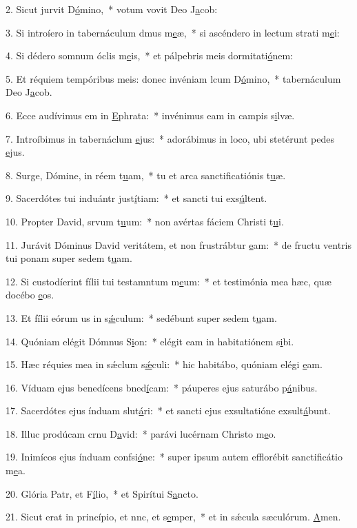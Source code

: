 2. Sicut jurvit D\uline{ó}mino,~* votum vovit Deo J\uline{a}cob:\par 
3. Si introíero in tabernáculum dmus m\uline{e}æ,~* si ascéndero in lectum strati m\uline{e}i:\par 
4. Si dédero somnum óclis m\uline{e}is,~* et pálpebris meis dormitati\uline{ó}nem:\par 
5. Et réquiem tempóribus meis: donec invéniam lcum D\uline{ó}mino,~* tabernáculum Deo J\uline{a}cob.\par 
6. Ecce audívimus em in \uline{E}phrata:~* invénimus eam in campis s\uline{i}lvæ.\par 
7. Introíbimus in tabernáclum \uline{e}jus:~* adorábimus in loco, ubi stetérunt pedes \uline{e}jus.\par 
8. Surge, Dómine, in réem t\uline{u}am,~* tu et arca sanctificatiónis t\uline{u}æ.\par 
9. Sacerdótes tui induántr just\uline{í}tiam:~* et sancti tui exs\uline{ú}ltent.\par 
10. Propter David, srvum t\uline{u}um:~* non avértas fáciem Christi t\uline{u}i.\par 
11. Jurávit Dóminus David veritátem, et non frustrábtur \uline{e}am:~* de fructu ventris tui ponam super sedem t\uline{u}am.\par 
12. Si custodíerint fílii tui testamntum m\uline{e}um:~* et testimónia mea hæc, quæ docébo \uline{e}os.\par 
13. Et fílii eórum us in s\uline{ǽ}culum:~* sedébunt super sedem t\uline{u}am.\par 
14. Quóniam elégit Dómnus S\uline{i}on:~* elégit eam in habitatiónem s\uline{i}bi.\par 
15. Hæc réquies mea in sǽclum s\uline{ǽ}culi:~* hic habitábo, quóniam elégi \uline{e}am.\par 
16. Víduam ejus benedícens bned\uline{í}cam:~* páuperes ejus saturábo p\uline{á}nibus.\par 
17. Sacerdótes ejus índuam slut\uline{á}ri:~* et sancti ejus exsultatióne exsult\uline{á}bunt.\par 
18. Illuc prodúcam crnu D\uline{a}vid:~* parávi lucérnam Christo m\uline{e}o.\par 
19. Inimícos ejus índuam confsi\uline{ó}ne:~* super ipsum autem efflorébit sanctificátio m\uline{e}a.\par 
20. Glória Patr, et F\uline{í}lio,~* et Spirítui S\uline{a}ncto.\par 
21. Sicut erat in princípio, et nnc, et s\uline{e}mper,~* et in sǽcula sæculórum. \uline{A}men.\par 

